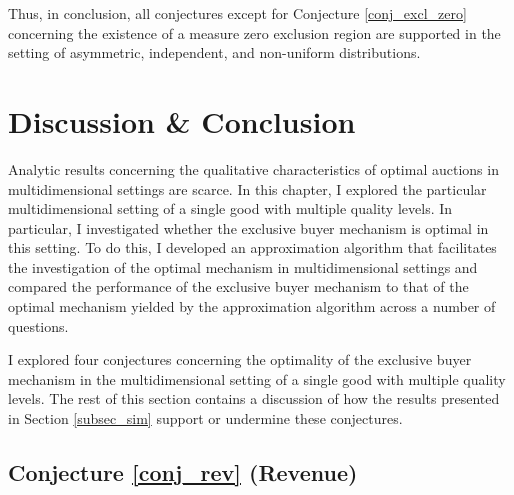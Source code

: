 
Thus, in conclusion, all conjectures except for Conjecture \ref{conj_excl_zero} concerning the existence of a measure zero exclusion region are supported in the setting of asymmetric, independent, and non-uniform distributions.




\section{Discussion \& Conclusion}\label{sec_discuss}

Analytic results concerning the qualitative characteristics of optimal auctions in multidimensional settings are scarce. In this chapter, I explored the particular multidimensional setting of a single good with multiple quality levels. In particular, I investigated whether the exclusive buyer mechanism is optimal in this setting. To do this, I developed an approximation algorithm that facilitates the investigation of the optimal mechanism in multidimensional settings and compared the performance of the exclusive buyer mechanism to that of the optimal mechanism yielded by the approximation algorithm across a number of questions. 

I explored four conjectures concerning the optimality of the exclusive buyer mechanism in the multidimensional setting of a single good with multiple quality levels. The rest of this section contains a discussion of how the results presented in Section \ref{subsec_sim} support or undermine these conjectures.

\subsection{Conjecture \ref{conj_rev} (Revenue)}

